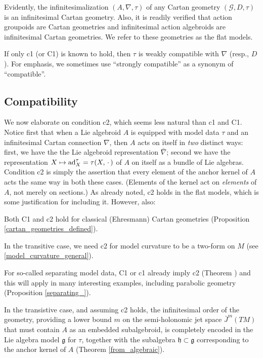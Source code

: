 \documentclass[leqno,12pt]{amsart} %
\begin{document}
Evidently, the infinitesimalization $(A, \nabla, \tau)$ of any Cartan geometry
$({\mathcal G}, D, \tau)$ is an infinitesimal Cartan geometry. Also, it is readily
verified that action groupoids are Cartan geometries and infinitesimal action algebroids
are infinitesimal Cartan geometries. We refer to these geometries as the {\df flat
  models}.

If only c1 (or C1) is known to hold, then $\tau $ is {\df weakly compatible} with $\nabla$
(resp., $D$). For emphasis, we sometimes use ``strongly compatible'' as a synonym of
``compatible''.

\subsection{Compatibility}
We now elaborate on condition c2, which seems less natural than c1 and C1. Notice
first that when a Lie algebroid $A$ is equipped with model data $\tau $ and an
infinitesimal Cartan connection $\nabla$, then $A$ acts on itself in {\em two} distinct
ways: first, we have the the Lie algebroid representation $\bar\nabla$; second we have the
representation $X \mapsto \operatorname{ad}^\tau_X = \tau(X,\,\cdot\,)$ of $A$ on itself as a
bundle of Lie algebras. Condition c2 is simply the assertion that every element of the
anchor kernel of $A$ acts the same way in both these cases. (Elements of the kernel act on
{\em elements} of $A$, not merely on sections.) As already noted, c2 holds in the flat
models, which is some justification for including it. However, also:
\begin{conditions}
\item Both C1 and c2 hold for classical (Ehresmann) Cartan geometries (Proposition
  \ref{cartan_geometries_defined}).
\item In the transitive case, we need c2 for model curvature to be a two-form on $M$
  (see \ref{model_curvature_general}).
\item\label{sep}  For so-called {\df separating} model data, C1 or c1 already imply c2
  (Theorem ) and this will apply in many interesting
  examples, including parabolic geometry (Proposition \ref{separating_}).
\item In the transistive case, and assuming c2 holds, the {\df infinitesimal order} of the
  geometry, providing a lower bound $m$ on the semi-holonomic jet space $\bar J^m(TM)$
  that must contain $A$ as an embedded subalgebroid, is completely encoded in the Lie
  algebra model ${\mathfrak g}$ for $\tau $, together with the subalgebra
  ${\mathfrak h} \subset {\mathfrak g} $ corresponding to the anchor kernel of $A$
  (Theorem \ref{from_algebraic}).
\end{conditions}
\end{document}
